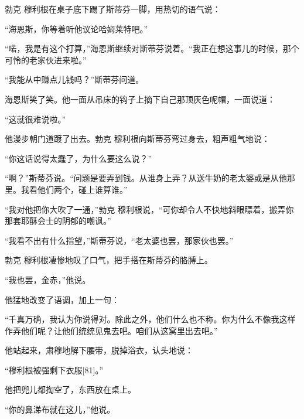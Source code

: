 \documentclass{article}
\begin{document}
勃克 \cdot 穆利根在桌子底下踢了斯蒂芬一脚，用热切的语气说：



“海恩斯，你等着听他议论哈姆莱特吧。”



“喏，我是有这个打算，”海恩斯继续对斯蒂芬说着。“我正在想这事儿的时候，那个可怜的老家伙进来啦。”



“我能从中赚点儿钱吗？”斯蒂芬问道。



海恩斯笑了笑。他一面从吊床的钩子上摘下自己那顶灰色呢帽，一面说道：



“这就很难说啦。”



他漫步朝门道踱了出去。勃克 \cdot 穆利根向斯蒂芬弯过身去，粗声粗气地说：



“你这话说得太蠢了，为什么要这么说？”



“啊？”斯蒂芬说。“问题是要弄到钱。从谁身上弄？从送牛奶的老太婆或是从他那里。我看他们两个，碰上谁算谁。”



“我对他把你大吹了一通，”勃克 \cdot 穆利根说，“可你却令人不快地斜眼瞟着，搬弄你那套耶酥会士的阴郁的嘲讽。”



“我看不出有什么指望，”斯蒂芬说，“老太婆也罢，那家伙也罢。”



勃克 \cdot 穆利根凄惨地叹了口气，把手搭在斯蒂芬的胳膊上。



“我也罢，金赤，”他说。



他猛地改变了语调，加上一句：



“千真万确，我认为你说得对。除此之外，他们什么也不称。你为什么不像我这样作弄他们呢？让他们统统见鬼去吧。咱们从这窝里出去吧。”



他站起来，肃穆地解下腰带，脱掉浴衣，认头地说：



“穆利根被强剩下衣服[81]。”



他把兜儿都掏空了，东西放在桌上。



“你的鼻涕布就在这儿，”他说。
\end{document}
